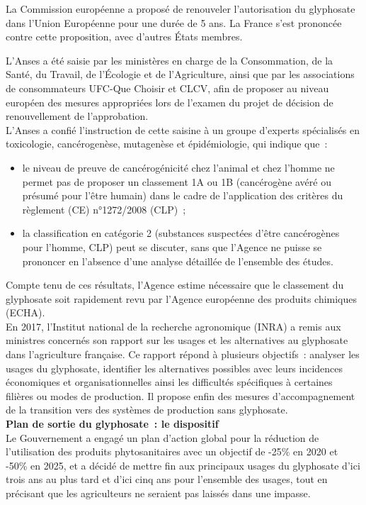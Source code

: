 \documentclass[8pt]{article}
\begin{document}
La Commission européenne a proposé de renouveler l’autorisation du glyphosate dans l’Union Européenne pour une durée de 5 ans. La France s’est prononcée contre cette proposition, avec d’autres États membres.

L’Anses a été saisie par les ministères en charge de la Consommation, de la Santé, du Travail, de l’Écologie et de l’Agriculture, ainsi que par les associations de consommateurs UFC-Que Choisir et CLCV, afin de proposer au niveau européen des mesures appropriées lors de l’examen du projet de décision de renouvellement de l’approbation.\\

L’Anses a confié l’instruction de cette saisine à un groupe d’experts spécialisés en toxicologie, cancérogenèse, mutagenèse et épidémiologie, qui indique que~:
\begin{itemize}
	\setlength\itemsep{-0.25em}
	\item le niveau de preuve de cancérogénicité chez l’animal et chez l’homme ne permet pas de proposer un classement 1A ou 1B (cancérogène avéré ou présumé pour l'être humain) dans le cadre de l’application des critères du règlement (CE) n°1272/2008 (CLP)~;
	\item la classification en catégorie 2 (substances suspectées d'être cancérogènes pour l'homme, CLP) peut se discuter, sans que l’Agence ne puisse se prononcer en l’absence d’une analyse détaillée de l’ensemble des études.
\end{itemize}


Compte tenu de ces résultats, l’Agence estime nécessaire que le classement du glyphosate soit rapidement revu par l’Agence européenne des produits chimiques (ECHA).\\

En 2017, l’Institut national de la recherche  agronomique (INRA) a remis aux ministres concernés son rapport sur les usages et les alternatives au glyphosate dans l’agriculture française. Ce rapport répond à plusieurs objectifs~: analyser les usages du glyphosate, identifier les alternatives possibles avec leurs incidences économiques et organisationnelles ainsi les difficultés spécifiques à certaines filières ou modes de production.  Il propose enfin des mesures d’accompagnement de la transition vers des systèmes de production sans glyphosate.\\

\textbf{Plan de sortie du glyphosate~: le dispositif}\\

Le Gouvernement a engagé un plan d’action global pour la réduction de l’utilisation des produits phytosanitaires avec un objectif de -25\% en 2020 et -50\% en 2025, et a décidé de mettre fin aux principaux usages du glyphosate d’ici trois ans au plus tard et d’ici cinq ans pour l’ensemble des usages, tout en précisant que les agriculteurs ne seraient pas laissés dans une impasse.  \\
\end{document}
